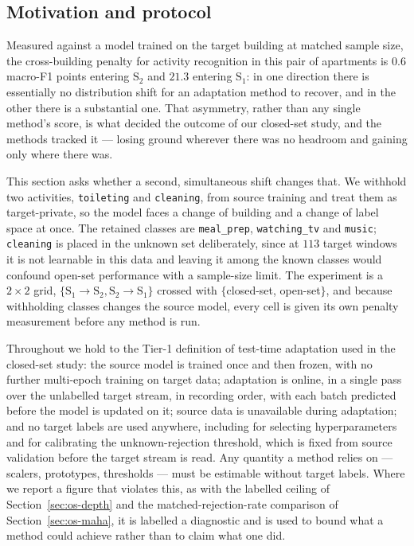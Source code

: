 \subsection{Motivation and protocol}
\label{sec:os-setup}

Measured against a model trained on the target building at matched sample size, the
cross-building penalty for activity recognition in this pair of apartments is $0.6$
macro-F1 points entering $\text{S}_2$ and $21.3$ entering $\text{S}_1$: in one direction
there is essentially no distribution shift for an adaptation method to recover, and in the
other there is a substantial one. That asymmetry, rather than any single method's score,
is what decided the outcome of our closed-set study, and the methods tracked it --- losing
ground wherever there was no headroom and gaining only where there was.

This section asks whether a second, simultaneous shift changes that. We withhold two
activities, \texttt{toileting} and \texttt{cleaning}, from source training and treat them
as target-private, so the model faces a change of building and a change of label space at
once. The retained classes are \texttt{meal\_prep}, \texttt{watching\_tv} and
\texttt{music}; \texttt{cleaning} is placed in the unknown set deliberately, since at $113$
target windows it is not learnable in this data and leaving it among the known classes
would confound open-set performance with a sample-size limit. The experiment is a
$2\times2$ grid, $\{\text{S}_1\!\to\!\text{S}_2, \text{S}_2\!\to\!\text{S}_1\}$ crossed
with $\{$closed-set, open-set$\}$, and because withholding classes changes the source
model, every cell is given its own penalty measurement before any method is run.

Throughout we hold to the Tier-1 definition of test-time adaptation used in the
closed-set study: the source model is trained once and then frozen, with no further
multi-epoch training on target data; adaptation is online, in a single pass over the
unlabelled target stream, in recording order, with each batch predicted before the model
is updated on it; source data is unavailable during adaptation; and no target labels are
used anywhere, including for selecting hyperparameters and for calibrating the
unknown-rejection threshold, which is fixed from source validation before the target
stream is read. Any quantity a method relies on --- scalers, prototypes, thresholds ---
must be estimable without target labels. Where we report a figure that violates this, as
with the labelled ceiling of Section~\ref{sec:os-depth} and the matched-rejection-rate
comparison of Section~\ref{sec:os-maha}, it is labelled a diagnostic and is used to bound
what a method could achieve rather than to claim what one did.

